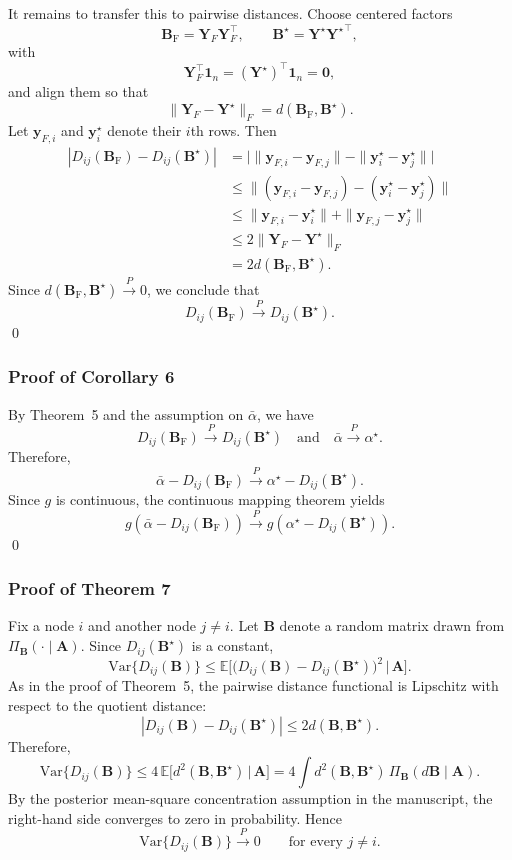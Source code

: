 \documentclass[12pt]{article}
\newcommand{\bbE}{\mathbb{E}}
\newcommand{\bfA}{\boldsymbol{A}}
\newcommand{\bfB}{\boldsymbol{B}}
\newcommand{\bfY}{\boldsymbol{Y}}
\newcommand{\bfy}{\boldsymbol{y}}
\newcommand{\bfone}{\boldsymbol{1}}
\newcommand{\bfzero}{\boldsymbol{0}}
\newcommand{\BF}{\bfB_{\mathrm{F}}}
\begin{document}
It remains to transfer this to pairwise distances. Choose centered factors
\[
\BF=\bfY_F\bfY_F^\top,\qquad \bfB^\star=\bfY^\star{\bfY^\star}^\top,
\]
with
\[
\bfY_F^\top\bfone_n=(\bfY^\star)^\top\bfone_n=\bfzero,
\]
and align them so that
\[
\|\bfY_F-\bfY^\star\|_F = d(\BF,\bfB^\star).
\]
Let $\bfy_{F,i}$ and $\bfy_i^\star$ denote their $i$th rows. Then
\begin{align*}
	|D_{ij}(\BF)-D_{ij}(\bfB^\star)|
	&=
	\big|\|\bfy_{F,i}-\bfy_{F,j}\|-\|\bfy_i^\star-\bfy_j^\star\|\big| \\
	&\le
	\|(\bfy_{F,i}-\bfy_{F,j})-(\bfy_i^\star-\bfy_j^\star)\| \\
	&\le
	\|\bfy_{F,i}-\bfy_i^\star\|+\|\bfy_{F,j}-\bfy_j^\star\| \\
	&\le
	2\|\bfY_F-\bfY^\star\|_F \\
	&=
	2d(\BF,\bfB^\star).
\end{align*}
Since $d(\BF,\bfB^\star)\xrightarrow{P}0$, we conclude that
\[
D_{ij}(\BF) \xrightarrow{P} D_{ij}(\bfB^\star).
\]
\qed

\subsubsection*{Proof of Corollary 6}
By Theorem~5 and the assumption on $\bar{\alpha}$, we have
\[
D_{ij}(\BF) \xrightarrow{P} D_{ij}(\bfB^\star)
\quad\text{and}\quad
\bar{\alpha}\xrightarrow{P}\alpha^\star.
\]
Therefore,
\[
\bar{\alpha}-D_{ij}(\BF)
\xrightarrow{P}
\alpha^\star-D_{ij}(\bfB^\star).
\]
Since $g$ is continuous, the continuous mapping theorem yields
\[
g\!\left(\bar{\alpha}-D_{ij}(\BF)\right)
\xrightarrow{P}
g\!\left(\alpha^\star-D_{ij}(\bfB^\star)\right).
\]
\qed

\subsubsection*{Proof  of Theorem 7}
Fix a node $i$ and another node $j\neq i$. Let $\bfB$ denote a random matrix drawn from
$\Pi_{\bfB}(\cdot\mid \bfA)$. Since $D_{ij}(\bfB^\star)$ is a constant,
\[
\mathrm{Var}\{D_{ij}(\bfB)\}
\le
\bbE\big[\big(D_{ij}(\bfB)-D_{ij}(\bfB^\star)\big)^2\,\big|\,\bfA\big].
\]
As in the proof of Theorem~5, the pairwise distance functional is Lipschitz with respect to the
quotient distance:
\[
|D_{ij}(\bfB)-D_{ij}(\bfB^\star)|\le 2d(\bfB,\bfB^\star).
\]
Therefore,
\[
\mathrm{Var}\{D_{ij}(\bfB)\}
\le
4\,\bbE\big[d^2(\bfB,\bfB^\star)\,\big|\,\bfA\big]
=
4\int d^2(\bfB,\bfB^\star)\,\Pi_{\bfB}(d\bfB\mid \bfA).
\]
By the posterior mean-square concentration assumption in the manuscript, the right-hand side
converges to zero in probability. Hence
\[
\mathrm{Var}\{D_{ij}(\bfB)\}\xrightarrow{P}0
\qquad\text{for every } j\neq i.
\]
\end{document}
